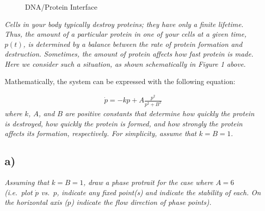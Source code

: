 \documentclass[12pt]{article}
\begin{document}
\begin{figure}[h]
	\centering
	\label{Figure_1}
	\caption{DNA/Protein Interface}
\end{figure}

{\it Cells in your body typically destroy proteins; they have only a finite lifetime.  Thus, the amount of a particular protein in one of your cells at a given time, $p(t)$, is determined by a balance between the rate of protein formation and destruction.  Sometimes, the amount of protein affects how fast protein is made.  Here we consider such a situation, as shown schematically in \emph{Figure 1} above.

Mathematically, the system can be expressed with the following equation:}
\begin{align*}
	\label{change_protein}
	\dot{p} = -kp + A\frac{p^2}{p^2 + B^2}
\end{align*}
{\it where $k$, $A$, and $B$ are positive constants that determine how quickly the protein is destroyed, how quickly the protein is formed, and how strongly the protein affects its formation, respectively.  For simplicity, assume that $k = B = 1$.}

\subsection*{ a)}
{\it Assuming that $k = B = 1$, draw a phase protrait for the case where $A = 6$ (i.e.~plot $\dot{p}$ vs.~$p$, indicate any fixed point(s) and indicate the stability of each.  On the horizontal axis ($p$) indicate the flow direction of phase points).} 
\end{document}
